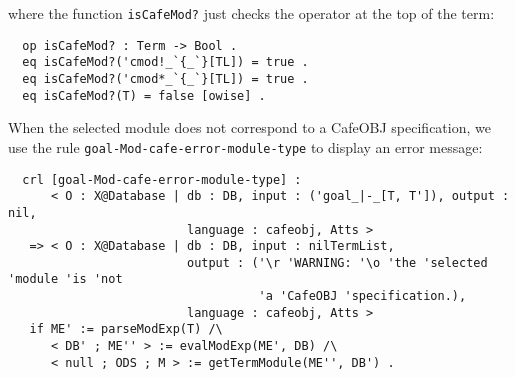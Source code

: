 \noindent
where the function \verb"isCafeMod?" just checks the operator at the top of the term:

{\codesize
\begin{verbatim}
  op isCafeMod? : Term -> Bool .
  eq isCafeMod?('cmod!_`{_`}[TL]) = true .
  eq isCafeMod?('cmod*_`{_`}[TL]) = true .
  eq isCafeMod?(T) = false [owise] .
\end{verbatim}
}

When the selected module does not correspond to a CafeOBJ specification, we use the
rule \texttt{goal-Mod-cafe-error-module-type} to display an error message:

{\codesize
\begin{verbatim}
  crl [goal-Mod-cafe-error-module-type] :
      < O : X@Database | db : DB, input : ('goal_|-_[T, T']), output : nil,
                         language : cafeobj, Atts >
   => < O : X@Database | db : DB, input : nilTermList,
                         output : ('\r 'WARNING: '\o 'the 'selected 'module 'is 'not
                                   'a 'CafeOBJ 'specification.),
                         language : cafeobj, Atts >
   if ME' := parseModExp(T) /\
      < DB' ; ME'' > := evalModExp(ME', DB) /\
      < null ; ODS ; M > := getTermModule(ME'', DB') .
\end{verbatim}
}

{\codesize
\begin{comment}
  crl [goal-Mod-cafe-error-module-type] :
      < O : X@Database | db : DB, input : ('goal_|-_[T, T']), output : nil,
                         language : cafeobj, Atts >
   => < O : X@Database | db : DB, input : nilTermList,
                         output : ('\n '\r 'WARNING: '\o 'the 'selected 'module 'is 'not
                                   'a 'CafeOBJ 'specification. '\n),
                         language : cafeobj, Atts >
   if ME' := parseModExp(T) /\
      < DB' ; ME'' > := evalModExp(ME', DB) /\
      < T1 ; ODS ; M > := getTermModule(ME'', DB') /\
      not isCafeMod?(T1) .

  crl [goal-Mod-cafe-error-no-module] :
      < O : X@Database | db : DB, input : ('goal_|-_[T, T']), output : nil,
                         language : cafeobj, Atts >
   => < O : X@Database | db : DB, input : nilTermList,
                         output : ('\n '\r 'WARNING: '\o 'the 'selected 'module 'is 'not
                                   'in 'the 'database. '\n),
                         language : cafeobj, Atts >
   if ME' := parseModExp(T) /\
      < DB' ; ME'' > := evalModExp(ME', DB) /\
      not unitInDb(ME'', DB') .
\end{comment}
}

